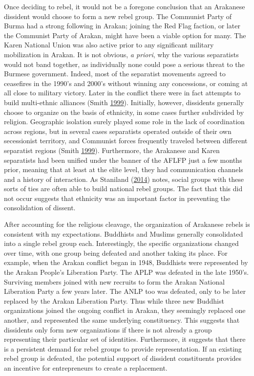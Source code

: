 \documentclass[12pt,]{book}
\theoremstyle{definition}
\theoremstyle{definition}
\theoremstyle{definition}
\theoremstyle{remark}
\begin{document}
Once deciding to rebel, it would not be a foregone conclusion that an
Arakanese dissident would choose to form a new rebel group. The
Communist Party of Burma had a strong following in Arakan; joining the
Red Flag faction, or later the Communist Party of Arakan, might have
been a viable option for many. The Karen National Union was also active
prior to any significant military mobilization in Arakan. It is not
obvious, \emph{a priori}, why the various separatists would not band
together, as individually none could pose a serious threat to the
Burmese government. Indeed, most of the separatist movements agreed to
ceasefires in the 1990's and 2000's without winning any concessions, or
coming at all close to military victory. Later in the conflict there
were in fact attempts to build multi-ethnic alliances (Smith
\protect\hyperlink{ref-Smith1999}{1999}). Initially, however, dissidents
generally choose to organize on the basis of ethnicity, in some cases
further subdivided by religion. Geographic isolation surely played some
role in the lack of coordination across regions, but in several cases
separatists operated outside of their own secessionist territory, and
Communist forces frequently traveled between different separatist
regions (Smith \protect\hyperlink{ref-Smith1999}{1999}). Furthermore,
the Arakanese and Karen separatists had been unified under the banner of
the AFLFP just a few months prior, meaning that at least at the elite
level, they had communication channels and a history of interaction. As
Staniland (\protect\hyperlink{ref-Staniland2014}{2014}) notes, social
groups with these sorts of ties are often able to build national rebel
groups. The fact that this did not occur suggests that ethnicity was an
important factor in preventing the consolidation of dissent.

After accounting for the religious cleavage, the organization of
Arakanese rebels is consistent with my expectations. Buddhists and
Muslims generally consolidated into a single rebel group each.
Interestingly, the specific organizations changed over time, with one
group being defeated and another taking its place. For example, when the
Arakan conflict began in 1948, Buddhists were represented by the Arakan
People's Liberation Party. The APLP was defeated in the late 1950's.
Surviving members joined with new recruits to form the Arakan National
Liberation Party a few years later. The ANLP too was defeated, only to
be later replaced by the Arakan Liberation Party. Thus while three new
Buddhist organizations joined the ongoing conflict in Arakan, they
seemingly replaced one another, and represented the same underlying
constituency. This suggests that dissidents only form new organizations
if there is not already a group representing their particular set of
identities. Furthermore, it suggests that there is a persistent demand
for rebel groups to provide representation. If an existing rebel group
is defeated, the potential support of dissident constituents provides an
incentive for entrepreneurs to create a replacement.
\end{document}
